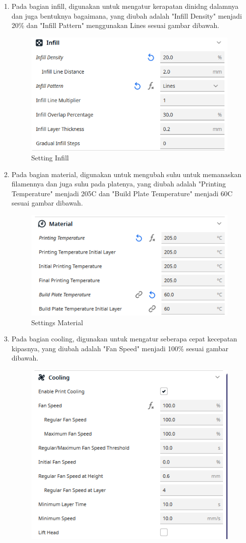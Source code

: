 \begin{enumerate}
    \item Pada bagian infill, digunakan untuk mengatur kerapatan dinidng dalamnya dan juga bentuknya bagaimana,
    yang diubah adalah "Infill Density" menjadi 20\% dan "Infill Pattern" menggunakan Lines sesuai gambar dibawah.
    \begin{figure}[H]
        \centering
        \includegraphics[width=0.5\linewidth]{P3/img/Settings infill 2.png}
        \caption{Setting Infill}
        \label{fig:Settings Infill}
    \end{figure}
    \item Pada bagian material, digunakan untuk mengubah suhu untuk memanaskan filamennya dan juga suhu pada platenya,
    yang diubah adalah "Printing Temperature" menjadi 205\degree C dan "Build Plate Temperature" menjadi 60\degree C sesuai gambar dibawah.
    \begin{figure}[H]
        \centering
        \includegraphics[width=0.5\linewidth]{P3/img/Settings material.png}
        \caption{Settings Material}
        \label{fig:Settings Material}
    \end{figure}
    \item Pada bagian cooling, digunakan untuk mengatur seberapa cepat kecepatan kipasnya,
    yang diubah adalah "Fan Speed" menjadi 100\% sesuai gambar dibawah.
    \begin{figure}[H]
        \centering
        \includegraphics[width=0.5\linewidth]{P3/img/Settings cooling.png}

\end{figure}
\end{enumerate}

